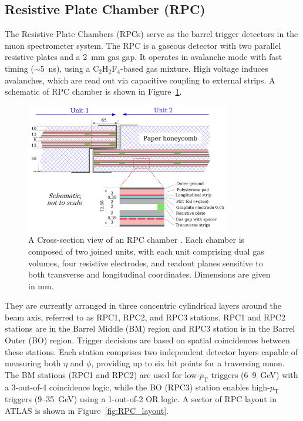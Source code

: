 \subsection{Resistive Plate Chamber (RPC)}
The Resistive Plate Chambers (RPCs) serve as the barrel trigger detectors in the muon spectrometer system. The RPC is a gaseous detector with two parallel resistive plates and a 2~mm gas gap. It operates in avalanche mode with fast timing ($\sim$5~ns), using a C$_2$H$_2$F$_4$-based gas mixture. High voltage induces avalanches, which are read out via capacitive coupling to external strips. A schematic of RPC chamber is shown in Figure~\ref{fig:RPC_cross_section}.

\begin{figure}[htbp]
  \centering
  \includegraphics[width=0.8\textwidth]{figs/chapter2/RPC_cross_section.png}
  \caption{A Cross-section view of an RPC chamber \cite{ATLASDetector2008}. Each chamber is composed of two joined units, with each unit comprising dual gas volumes, four resistive electrodes, and readout planes sensitive to both transverse and longitudinal coordinates. Dimensions are given in mm.}
  \label{fig:RPC_cross_section}
\end{figure}

They are currently arranged in three concentric cylindrical layers around the beam axis, referred to as RPC1, RPC2, and RPC3 stations. RPC1 and RPC2 stations are in the Barrel Middle (BM) region and RPC3 station is in the Barrel Outer (BO) region. Trigger decisions are based on spatial coincidences between these stations. Each station comprises two independent detector layers capable of measuring both $\eta$ and $\phi$, providing up to six hit points for a traversing muon. The BM stations (RPC1 and RPC2) are used for low-$p_\mathrm{T}$ triggers (6--9~GeV) with a 3-out-of-4 coincidence logic, while the BO (RPC3) station enables high-$p_\mathrm{T}$ triggers (9--35~GeV) using a 1-out-of-2 OR logic. A sector of RPC layout in ATLAS is shown in Figure~\ref{fig:RPC_layout}.

